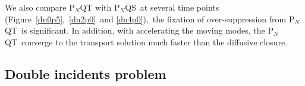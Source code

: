 \documentclass[review]{elsarticle}
\newcommand{\pn}{P$_N$}
\newcommand{\pnqt}{P$_N$QT}
\newcommand{\pnqs}{P$_N$QS}
\begin{document}
We also compare P$_N$QT with \pnqs~at several time points (Figure~\ref{dn0p5},~\ref{dn2p0}~and \ref{dn4p0}),~the fixation of over-suppression from \pnqt~is significant. In addition, with accelerating the moving modes, the \pnqt~converge to the transport solution much faster than the diffusive closure.
%



\subsection{Double incidents problem}
\end{document}
